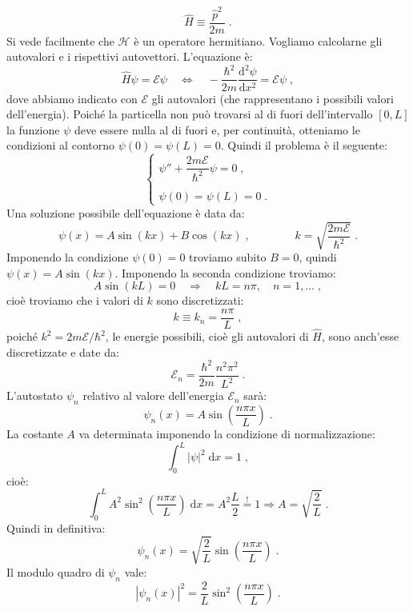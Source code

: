 \documentclass[10pt,a4paper]{report}
\theoremstyle{definition}
\newcommand{\dev}[3][]{\frac{\mathrm{d}^{#1} #2}{\mathrm{d} #3^{#1}}}
\newcommand{\ham}{\mathcal{H}}
\numberwithin{equation}{section}
\newcommand{\diff}[1][]{\mathrm{d}#1}
\begin{document}
$$
\hat{H} \equiv \frac{\hat{p}^2}{2m}\;.
$$
Si vede facilmente che $\ham$ è un operatore hermitiano. Vogliamo calcolarne gli autovalori e i rispettivi autovettori. L'equazione è:
\begin{equation}
\hat{H} \psi=\mathcal{E}\psi\quad \Longleftrightarrow \quad-\frac{\hbar^2}{2m}\dev[2]{\psi}{x}=\mathcal{E}\psi\;,
\end{equation}
dove abbiamo indicato con $\mathcal{E}$ gli autovalori (che rappresentano i possibili valori dell'energia). Poiché la particella non può trovarsi al di fuori dell'intervallo $[0,L]$ la funzione $\psi$ deve essere nulla al di fuori e, per continuità, otteniamo le condizioni al contorno $\psi(0)=\psi(L)=0$. Quindi il problema è il seguente:
\begin{equation}
\begin{cases}
\psi''+\dfrac{2m\mathcal{E}}{\hbar^2}\psi=0\;, \\
\\
\psi(0)=\psi(L)=0\;.
\end{cases}
\end{equation}
Una soluzione possibile dell'equazione è data da:
$$
\psi(x)=A\sin(kx)+B\cos(kx)\;,\qquad\qquad k=\sqrt{\frac{2m\mathcal{E}}{\hbar^2}}\;.
$$
Imponendo la condizione $\psi(0)=0$ troviamo subito $B=0$, quindi $\psi(x)=A\sin(kx)$. Imponendo la seconda condizione troviamo:
$$
A\sin(kL)=0\quad \Longrightarrow \quad kL=n\pi,\quad n=1,\ldots\;,
$$
cioè troviamo che i valori di $k$ sono discretizzati:
$$
k\equiv k_n=\frac{n\pi}{L}\;,
$$
poiché $k^2=2m\mathcal{E}/\hbar^2$, le energie possibili, cioè gli autovalori di $\hat{H}$, sono anch'esse discretizzate e date da:
\begin{equation}
\mathcal{E}_n=\frac{\hbar^2}{2m}\frac{n^2\pi^2}{L^2}\;.
\end{equation}
L'autostato $\psi_n$ relativo al valore dell'energia $\mathcal{E}_n$ sarà:
\begin{equation}
\psi_n(x)=A\sin\left(\frac{n\pi x}{L}\right)\;.
\end{equation}
La costante $A$ va determinata imponendo la condizione di normalizzazione:
$$
\int_0^L |\psi|^2\;\diff{x}=1\;,
$$
cioè:
$$
\int_0^L A^2 \sin^2\left(\frac{n\pi x}{L}\right)\;\diff{x}=A^2\frac{L}{2}\stackrel{!}{=}1 \Longrightarrow A=\sqrt{\frac{2}{L}}\;.
$$
Quindi in definitiva:
\begin{equation}
\psi_n(x)=\sqrt{\frac{2}{L}}\sin\left(\frac{n\pi x}{L}\right)\;.
\end{equation}
Il modulo quadro di $\psi_n$ vale:
$$
|\psi_n(x)|^2=\frac{2}{L}\sin^2\left(\frac{n\pi x}{L}\right)\;.
$$
\end{document}
